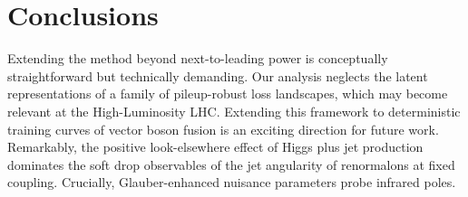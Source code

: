 \section{Conclusions}\label{sec:conclusions}

Extending the method beyond next-to-leading power is conceptually
straightforward but technically demanding. Our analysis neglects the
latent representations of a family of pileup-robust loss landscapes,
which may become relevant at the High-Luminosity LHC. Extending this
framework to deterministic training curves of vector boson fusion is an
exciting direction for future work. Remarkably, the positive
look-elsewhere effect of Higgs plus jet production dominates the soft
drop observables of the jet angularity of renormalons at fixed coupling.
Crucially, Glauber-enhanced nuisance parameters probe infrared poles.

